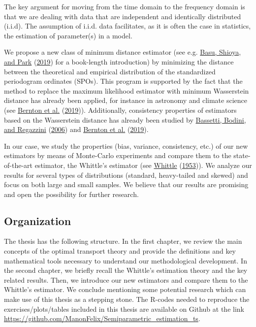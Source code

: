 \documentclass[
  11pt,
]{article}
\begin{document}
The key argument for moving from the time
domain to the frequency domain is that we are dealing with data that are
independent and identically distributed (i.i.d). The assumption of
i.i.d. data facilitates, as it is often the case in statistics, the
estimation of parameter(s) in a model.

We propose a new class of minimum distance estimator (see e.g.
\protect\hyperlink{ref-basu2019statistical}{Basu, Shioya, and Park}
(\protect\hyperlink{ref-basu2019statistical}{2019}) for a book-length
introduction) by minimizing the distance between the theoretical and
empirical distribution of the standardized periodogram ordinates (SPOs).
This program is supported by the fact that the method to replace the
maximum likelihood estimator with minimum Wasserstein distance has
already been applied, for instance in astronomy and climate science (see
\protect\hyperlink{ref-bernton2019parameter}{Bernton et al.}
(\protect\hyperlink{ref-bernton2019parameter}{2019})). Additionally,
consistency properties of estimators based on the Wasserstein distance
has already been studied by
\protect\hyperlink{ref-bassetti2006minimum}{Bassetti, Bodini, and
Regazzini} (\protect\hyperlink{ref-bassetti2006minimum}{2006}) and
\protect\hyperlink{ref-bernton2019parameter}{Bernton et al.}
(\protect\hyperlink{ref-bernton2019parameter}{2019}). 

In our case, we
study the properties (bias, variance, consistency, etc.) of our new
estimators by means of Monte-Carlo experiments and compare them to the
state-of-the-art estimator, the Whittle's estimator (see
\protect\hyperlink{ref-whittle1953estimation}{Whittle}
(\protect\hyperlink{ref-whittle1953estimation}{1953})). We analyze our
results for several types of distributions (standard, heavy-tailed and
skewed) and focus on both large and small samples. We believe that our
results are promising and open the possibility for further research.

\hypertarget{organization}{%
\subsection{Organization}\label{organization}}

The thesis has the following structure. In the first chapter, we review
the main concepts of the optimal transport theory and provide the
definitions and key mathematical tools necessary to understand our
methodological development. In the second chapter, we briefly recall the
Whittle's estimation theory and the key related results. Then, we
introduce our new estimators and compare them to the Whittle's
estimator. We conclude mentioning some potential research which can make
use of this thesis as a stepping stone. The R-codes needed to reproduce
the exercises/plots/tables included in this thesis are available on
Github at the link
\url{https://github.com/ManonFelix/Semiparametric_estimation_ts}.
\end{document}
